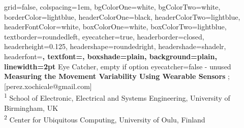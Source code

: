 \documentclass[a0paper,portrait]{baposter}
\begin{document}







\begin{poster}%
  {
  grid=false,
  colspacing=1em,
  bgColorOne=white,
  bgColorTwo=white,
  borderColor=lightblue,
  headerColorOne=black,
  headerColorTwo=lightblue,
  headerFontColor=white,
  boxColorOne=white,
  boxColorTwo=lightblue,
  textborder=roundedleft,
  eyecatcher=true,
  headerborder=closed,
  headerheight=0.125\textheight,
  headershape=roundedright,
  headershade=shadelr,
  headerfont=\Large\bf\textsc, %
  textfont={\setlength{\parindent}{1.5em}},
  boxshade=plain,
  background=plain,
  linewidth=2pt
  }
{
	Eye Catcher, empty if option eyecatcher=false - unused
}
{\bf
  {Measuring the Movement Variability  Using Wearable Sensors}
}
{
	{; [perez.xochicale@gmail.com]  } \\
	{\smaller
	\textsuperscript{1} School of Electronic, Electrical and Systems Engineering, University of Birmingham, UK \\
	\textsuperscript{2} Center for Ubiquitous Computing, University of Oulu, Finland }
}
  {%
  	\fbox{
    \begin{minipage}{11em}


\end{minipage}}}
\end{poster}
\end{document}
